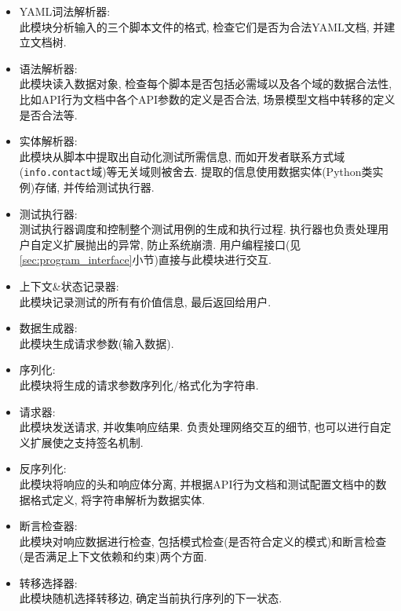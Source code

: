 	    \begin{itemize}
	        \item YAML词法解析器:\\
	            此模块分析输入的三个脚本文件的格式, 检查它们是否为合法YAML文档, 并建立文档树.
	        \item 语法解析器:\\
	            此模块读入数据对象, 检查每个脚本是否包括必需域以及各个域的数据合法性, 比如API行为文档中各个API参数的定义是否合法, 场景模型文档中转移的定义是否合法等.
	        \item 实体解析器:\\
	            此模块从脚本中提取出自动化测试所需信息, 而如开发者联系方式域(\texttt{info.contact}域)等无关域则被舍去. 提取的信息使用数据实体(Python类实例)存储, 并传给测试执行器.
	        \item 测试执行器:\\
	            测试执行器调度和控制整个测试用例的生成和执行过程. 执行器也负责处理用户自定义扩展抛出的异常, 防止系统崩溃. 用户编程接口(见\ref{sec:program_interface}小节)直接与此模块进行交互.
	        \item 上下文\&状态记录器:\\
	            此模块记录测试的所有有价值信息, 最后返回给用户.
	        \item 数据生成器:\\
	            此模块生成请求参数(输入数据).
	        \item 序列化:\\
	            此模块将生成的请求参数序列化/格式化为字符串.
	        \item 请求器:\\
	            此模块发送请求, 并收集响应结果. 负责处理网络交互的细节, 也可以进行自定义扩展使之支持签名机制.
	        \item 反序列化:\\
	            此模块将响应的头和响应体分离, 并根据API行为文档和测试配置文档中的数据格式定义, 将字符串解析为数据实体.
	        \item 断言检查器:\\
	            此模块对响应数据进行检查, 包括模式检查(是否符合定义的模式)和断言检查(是否满足上下文依赖和约束)两个方面.
	        \item 转移选择器:\\
	            此模块随机选择转移边, 确定当前执行序列的下一状态.
	    \end{itemize}
	    
